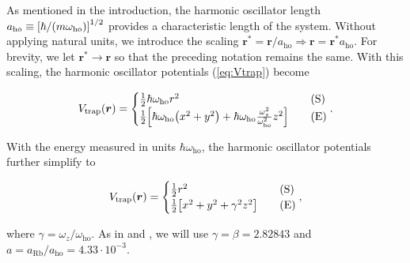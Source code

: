 As mentioned in the introduction, the harmonic oscillator length $a_\mathrm{ho} \equiv \qty[\hbar / \qty(m \omega_\mathrm{ho})]^{1/2}$ provides a characteristic length of the system. Without applying natural units, we introduce the scaling $\bm{r}^* = \bm{r}/a_\mathrm{ho} \Rightarrow \bm{r} = \bm{r}^* a_\mathrm{ho}$. For brevity, we let $\bm{r}^* \to \bm{r}$ so that the preceding notation remains the same. With this scaling, the harmonic oscillator potentials (\autoref{eq:Vtrap}) become 

\begin{equation*}
    V_\mathrm{trap} \qty(\bm{r}) = 
    \begin{cases}
        \frac{1}{2} \hbar \omega_\mathrm{ho} r^2 \quad &\text{(S)}
        \\
        \frac{1}{2} \qty[\hbar \omega_\mathrm{ho} \qty(x^2 + y^2) + \hbar \omega_\mathrm{ho} \frac{\omega_z^2}{\omega_\mathrm{ho}^2} z^2] \quad &\text{(E)}
    \end{cases}.
\end{equation*}

With the energy measured in units $\hbar \omega_\mathrm{ho}$, the harmonic oscillator potentials further simplify to 

\begin{equation}
    V_\mathrm{trap} \qty(\bm{r}) = 
    \begin{cases}
        \frac{1}{2} r^2 \quad &\text{(S)}
        \\
        \frac{1}{2} \qty[x^2 + y^2 + \gamma^2 z^2] \quad &\text{(E)}
    \end{cases},
\end{equation}

where $\gamma = \omega_z / \omega_\mathrm{ho}$. As in \cite{DuBois2001} and \cite{Nilsen2005}, we will use $\gamma = \beta=2.82843$ and $a = a_\mathrm{Rb} / a_\mathrm{ho} = 4.33 \cdot 10^{-3}$.  







